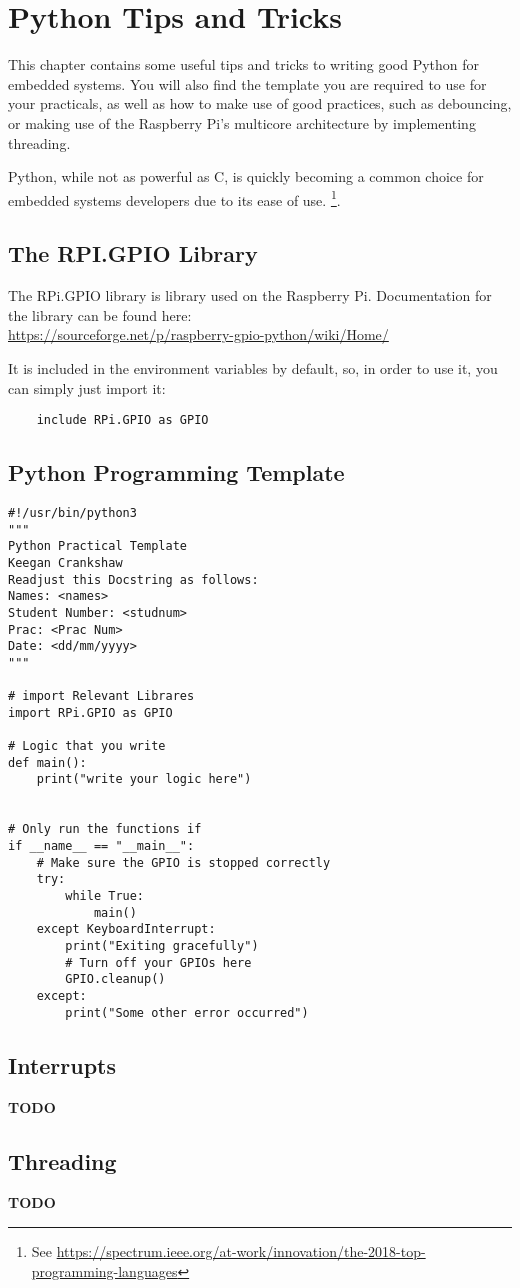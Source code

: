 \section{Python Tips and Tricks}
\label{app:Python}
This chapter contains some useful tips and tricks to writing good Python for embedded systems. You will also find the template you are required to use for your practicals, as well as how to make use of good practices, such as debouncing, or making use of the Raspberry Pi's multicore architecture by implementing threading.

Python, while not as powerful as C, is quickly becoming a common choice for embedded systems developers due to its ease of use. \footnote{See \href{https://spectrum.ieee.org/at-work/innovation/the-2018-top-programming-languages}{https://spectrum.ieee.org/at-work/innovation/the-2018-top-programming-languages}}. 

\subsection{The RPI.GPIO Library}
The RPi.GPIO library is library used on the Raspberry Pi. 
Documentation for the library can be found here:\\
\href{https://sourceforge.net/p/raspberry-gpio-python/wiki/Home/}{https://sourceforge.net/p/raspberry-gpio-python/wiki/Home/}

It is included in the environment variables by default, so, in order to use it, you can simply just import it:

\begin{verbatim}
    include RPi.GPIO as GPIO
\end{verbatim}

\subsection{Python Programming Template}
\begin{lstlisting}
#!/usr/bin/python3
"""
Python Practical Template
Keegan Crankshaw
Readjust this Docstring as follows:
Names: <names>
Student Number: <studnum>
Prac: <Prac Num>
Date: <dd/mm/yyyy>
"""

# import Relevant Librares
import RPi.GPIO as GPIO

# Logic that you write
def main():
    print("write your logic here")


# Only run the functions if 
if __name__ == "__main__":
	# Make sure the GPIO is stopped correctly
	try:
	    while True:
		    main()
	except KeyboardInterrupt:
		print("Exiting gracefully")
		# Turn off your GPIOs here
		GPIO.cleanup()
	except:
		print("Some other error occurred")

\end{lstlisting}

\subsection{Interrupts}
\textbf{TODO}

\subsection{Threading}
\textbf{TODO}

